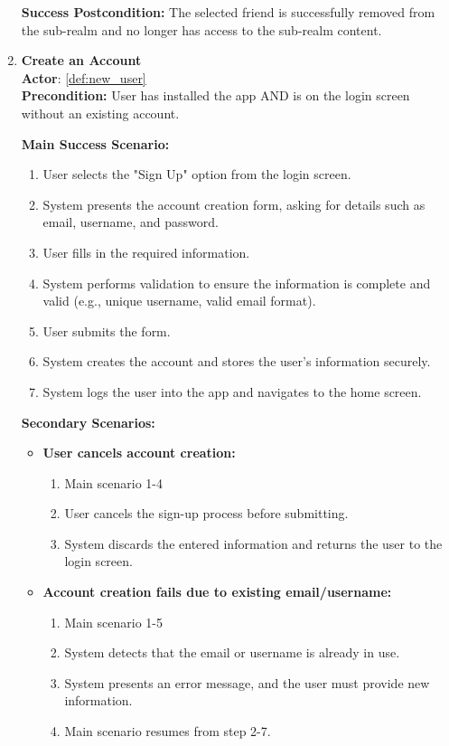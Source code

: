 \documentclass{article}
\begin{document}
\begin{enumerate}[label=\textbf{UC\arabic*}]
        \textbf{Success Postcondition:} The selected friend is successfully removed from the sub-realm and no longer has access to the sub-realm content.

    \item \label{uc:23} \textbf{Create an Account} \\
        \textbf{Actor}: \ref{def:new_user} \\
        \textbf{Precondition:} User has installed the app AND is on the login screen without an existing account.
    
        \textbf{Main Success Scenario:}
        \begin{enumerate}[label=\textbf{\arabic*.}]
            \item User selects the "Sign Up" option from the login screen.
            \item System presents the account creation form, asking for details such as email, username, and password.
            \item User fills in the required information.
            \item System performs validation to ensure the information is complete and valid (e.g., unique username, valid email format).
            \item User submits the form.
            \item System creates the account and stores the user’s information securely.
            \item System logs the user into the app and navigates to the home screen.
        \end{enumerate}
        
        \textbf{Secondary Scenarios:}
        \begin{itemize}
            \item[{}] \textbf{User cancels account creation:}
            \begin{enumerate}[label=\textbf{\arabic*.}]
                \item Main scenario 1-4
                \item User cancels the sign-up process before submitting.
                \item System discards the entered information and returns the user to the login screen.
            \end{enumerate}
            
            \item[{}] \textbf{Account creation fails due to existing email/username:}
            \begin{enumerate}[label=\textbf{\arabic*.}]
                \item Main scenario 1-5
                \item System detects that the email or username is already in use.
                \item System presents an error message, and the user must provide new information.
                \item Main scenario resumes from step 2-7.
            \end{enumerate}
        \end{itemize}
        

\end{enumerate}
\end{document}
